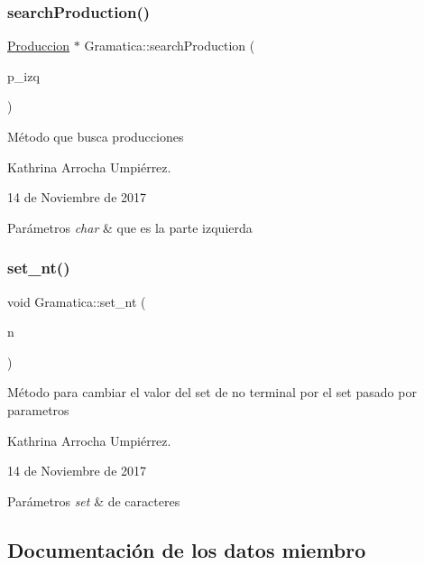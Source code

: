 \subsubsection{\texorpdfstring{search\+Production()}{searchProduction()}}
{\footnotesize\ttfamily \hyperlink{class_produccion}{Produccion} $\ast$ Gramatica\+::search\+Production (\begin{DoxyParamCaption}\item[{char}]{p\+\_\+izq }\end{DoxyParamCaption})}

Método que busca producciones

Kathrina Arrocha Umpiérrez.

14 de Noviembre de 2017 
\begin{DoxyParams}{Parámetros}
{\em char} & que es la parte izquierda \\
\hline
\end{DoxyParams}
\mbox{\label{class_gramatica_ae11df05a075362d577443b8f011aa24f}} 
\subsubsection{\texorpdfstring{set\+\_\+nt()}{set\_nt()}}
{\footnotesize\ttfamily void Gramatica\+::set\+\_\+nt (\begin{DoxyParamCaption}\item[{set$<$ char $>$}]{n }\end{DoxyParamCaption})}

Método para cambiar el valor del set de no terminal por el set pasado por parametros

Kathrina Arrocha Umpiérrez.

14 de Noviembre de 2017 
\begin{DoxyParams}{Parámetros}
{\em set} & de caracteres \\
\hline
\end{DoxyParams}


\subsection{Documentación de los datos miembro}
\mbox{\label{class_gramatica_a538ac9ed9a10b67ab206402b326e787e}} 
